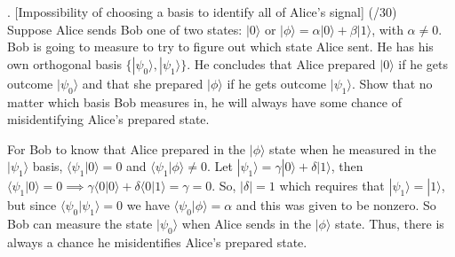 \documentclass[11pt]{article}
\newenvironment{solution}{\begin{mdframed}[skipabove=\baselineskip,innertopmargin=\baselineskip,innerbottommargin=\baselineskip]
  }{\end{mdframed}}
\begin{document}
\newpage

. [Impossibility of choosing a basis to identify all of Alice’s signal] (/30)
\vspace{1em} \\
Suppose Alice sends Bob one of two states: $|0\rangle$ or $ |\phi\rangle=\alpha|0\rangle+\beta|1\rangle$, with $\alpha\neq 0$. Bob is going to measure to try to figure out which state Alice sent. He has his own orthogonal basis $\{|\psi_0\rangle,|\psi_1\rangle\}$. He concludes that Alice prepared $|0\rangle$ if he gets outcome $|\psi_0\rangle$ and that she prepared $|\phi\rangle$ if he gets outcome $|\psi_1\rangle$. Show that no matter which basis Bob measures in, he will always have some chance of misidentifying Alice’s prepared state.

\begin{solution}
For Bob to know that Alice prepared in the $|\phi\rangle$ state when he measured in the $|\psi_1\rangle$ basis, $\langle\psi_1|0\rangle=0$ and $\langle\psi_1|\phi\rangle\neq0$. Let $|\psi_1\rangle = \gamma|0\rangle + \delta|1\rangle$, then $\langle\psi_1|0\rangle=0 \implies \gamma\langle0|0\rangle+\delta\langle0|1\rangle = \gamma = 0$. So, $|\delta| = 1$ which requires that $|\psi_1\rangle=|1\rangle$, but since $\langle\psi_0|\psi_1\rangle=0$ we have $\langle\psi_0|\phi\rangle = \alpha$ and this was given to be nonzero. So Bob can measure the state $|\psi_0\rangle$ when Alice sends in the $|\phi\rangle$ state. Thus, there is always a chance he misidentifies Alice’s prepared state.
\end{solution}
 
\end{document}
